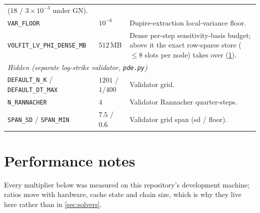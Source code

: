 \documentclass[11pt]{article}
\begin{document}
\begin{longtable}{p{}p{}p{}}
($18$ / $3\times10^{-3}$ under GN).\\
\texttt{VAR\_FLOOR} & $10^{-6}$ & Dupire-extraction local-variance floor.\\
\texttt{VOLFIT\_LV\_PHI\_DENSE\_MB} & $512$\,MB & Dense per-step
sensitivity-basis budget; above it the exact row-sparse store ($\le8$ slots
per node) takes over (\cref{app:perf}).\\
\midrule
\multicolumn{3}{l}{\emph{Hidden (separate log-strike validator,
\texttt{pde.py})}}\\ \midrule
\texttt{DEFAULT\_N\_K} / \texttt{DEFAULT\_DT\_MAX} & $1201$ / $1/400$ &
Validator grid.\\
\texttt{N\_RANNACHER} & $4$ & Validator Rannacher quarter-steps.\\
\texttt{SPAN\_SD} / \texttt{SPAN\_MIN} & $7.5$ / $0.6$ & Validator grid
span (sd / floor).\\
\bottomrule
\end{longtable}

\section{Performance notes}
\label{app:perf}

Every multiplier below was measured on this repository's development
machine; ratios move with hardware, cache state and chain size, which is
why they live here rather than in \cref{sec:solvers}.
\end{document}
